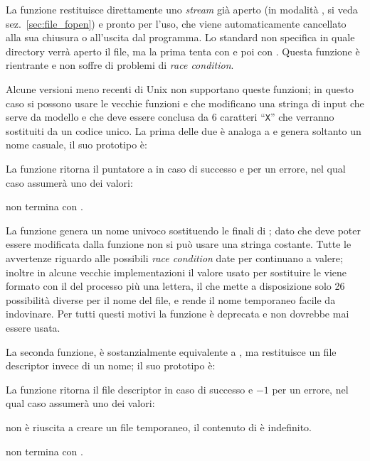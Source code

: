 La funzione restituisce direttamente uno \textit{stream} già aperto (in
modalità , si veda sez.~\ref{sec:file_fopen}) e pronto per l'uso,
che viene automaticamente cancellato alla sua chiusura o all'uscita dal
programma. Lo standard non specifica in quale directory verrà aperto il file,
ma la  prima tenta con  e poi con
. Questa funzione è rientrante e non soffre di problemi di
\textit{race condition}.

Alcune versioni meno recenti di Unix non supportano queste funzioni; in questo
caso si possono usare le vecchie funzioni  e  che
modificano una stringa di input che serve da modello e che deve essere
conclusa da 6 caratteri ``\texttt{X}'' che verranno sostituiti da un codice
unico. La prima delle due è analoga a  e genera soltanto un nome
casuale, il suo prototipo è:

\begin{funcproto}{
}
{La funzione ritorna  il puntatore a  in caso di successo e
   per un errore, nel qual caso  assumerà uno dei valori: 
  \begin{errlist}
    \item[\errcode{EINVAL}]  non termina con .
  \end{errlist}}
\end{funcproto}

La funzione genera un nome univoco sostituendo le  finali di
; dato che  deve poter essere modificata dalla
funzione non si può usare una stringa costante.  Tutte le avvertenze riguardo
alle possibili \textit{race condition} date per  continuano a
valere; inoltre in alcune vecchie implementazioni il valore usato per
sostituire le  viene formato con il  del processo più
una lettera, il che mette a disposizione solo 26 possibilità diverse per il
nome del file, e rende il nome temporaneo facile da indovinare.  Per tutti
questi motivi la funzione è deprecata e non dovrebbe mai essere usata.

La seconda funzione,  è sostanzialmente equivalente a
, ma restituisce un file descriptor invece di un nome; il suo
prototipo è:

\begin{funcproto}{
}

{La funzione ritorna il file descriptor in caso di successo e $-1$ per un
  errore, nel qual 
  caso  assumerà uno dei valori: 
  \begin{errlist}
    \item[\errcode{EEXIST}] non è riuscita a creare un file temporaneo, il
      contenuto di  è indefinito.
    \item[\errcode{EINVAL}]  non termina con .
  \end{errlist}}
\end{funcproto}

